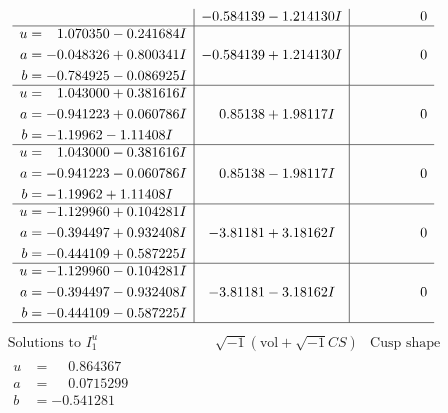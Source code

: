 \documentclass[1p]{elsarticle_modified}
\theoremstyle{definition}
\newcommand{\I}{\sqrt{-1}}
\begin{document}
$$\begin{array}{c|c|c}
 & -0.584139 - 1.214130 I & \phantom{-0.000000 } 0 \\ \hline\begin{aligned}
u &= \phantom{-}1.070350 - 0.241684 I \\
a &= -0.048326 + 0.800341 I \\
b &= -0.784925 - 0.086925 I\end{aligned}
 & -0.584139 + 1.214130 I & \phantom{-0.000000 } 0 \\ \hline\begin{aligned}
u &= \phantom{-}1.043000 + 0.381616 I \\
a &= -0.941223 + 0.060786 I \\
b &= -1.19962 - 1.11408 I\end{aligned}
 & \phantom{-}0.85138 + 1.98117 I & \phantom{-0.000000 } 0 \\ \hline\begin{aligned}
u &= \phantom{-}1.043000 - 0.381616 I \\
a &= -0.941223 - 0.060786 I \\
b &= -1.19962 + 1.11408 I\end{aligned}
 & \phantom{-}0.85138 - 1.98117 I & \phantom{-0.000000 } 0 \\ \hline\begin{aligned}
u &= -1.129960 + 0.104281 I \\
a &= -0.394497 + 0.932408 I \\
b &= -0.444109 + 0.587225 I\end{aligned}
 & -3.81181 + 3.18162 I & \phantom{-0.000000 } 0 \\ \hline\begin{aligned}
u &= -1.129960 - 0.104281 I \\
a &= -0.394497 - 0.932408 I \\
b &= -0.444109 - 0.587225 I\end{aligned}
 & -3.81181 - 3.18162 I & \phantom{-0.000000 } 0\\
 \hline 
 \end{array}$$\newpage$$\begin{array}{c|c|c}  
\text{Solutions to }I^u_{1}& \I (\text{vol} + \sqrt{-1}CS) & \text{Cusp shape}\\
 \hline 
\begin{aligned}
u &= \phantom{-}0.864367\phantom{ +0.000000I} \\
a &= \phantom{-}0.0715299\phantom{ +0.000000I} \\
b &= -0.541281\phantom{ +0.000000I}\end{aligned}

\end{array}$$
\end{document}

